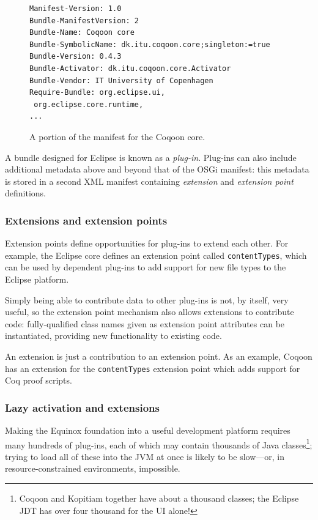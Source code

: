 \documentclass{article}
\newcommand{\fdef}[1]{\textit{#1}}
\begin{document}
\begin{figure}[h]
\begin{lstlisting}[basicstyle=\footnotesize\ttfamily]
Manifest-Version: 1.0
Bundle-ManifestVersion: 2
Bundle-Name: Coqoon core
Bundle-SymbolicName: dk.itu.coqoon.core;singleton:=true
Bundle-Version: 0.4.3
Bundle-Activator: dk.itu.coqoon.core.Activator
Bundle-Vendor: IT University of Copenhagen
Require-Bundle: org.eclipse.ui,
 org.eclipse.core.runtime,
...
\end{lstlisting}
\caption{A portion of the manifest for the Coqoon core.}
\end{figure}

A bundle designed for Eclipse is known as a \fdef{plug-in}. Plug-ins can also
include additional metadata above and beyond that of the OSGi manifest: this
metadata is stored in a second XML manifest containing \fdef{extension} and
\fdef{extension point} definitions.

\subsubsection{Extensions and extension points}

Extension points define opportunities for plug-ins to extend each other. For
example, the Eclipse core defines an extension point called
\texttt{contentTypes}, which can be used by dependent plug-ins to add support
for new file types to the Eclipse platform.

Simply being able to contribute data to other plug-ins is not, by itself, very
useful, so the extension point mechanism also allows extensions to contribute
code: fully-qualified class names given as extension point attributes can be
instantiated, providing new functionality to existing code.

An extension is just a contribution to an extension point. As an example,
Coqoon has an extension for the \texttt{contentTypes} extension point which
adds support for Coq proof scripts.

\subsubsection{Lazy activation and extensions}

Making the Equinox foundation into a useful development platform requires many
hundreds of plug-ins, each of which may contain thousands of Java
classes\footnote{Coqoon and Kopitiam together have about a thousand classes;
the Eclipse JDT has over four thousand for the UI alone!}; trying to load all
of these into the JVM at once is likely to be slow---or, in
resource-constrained environments, impossible.
\end{document}
